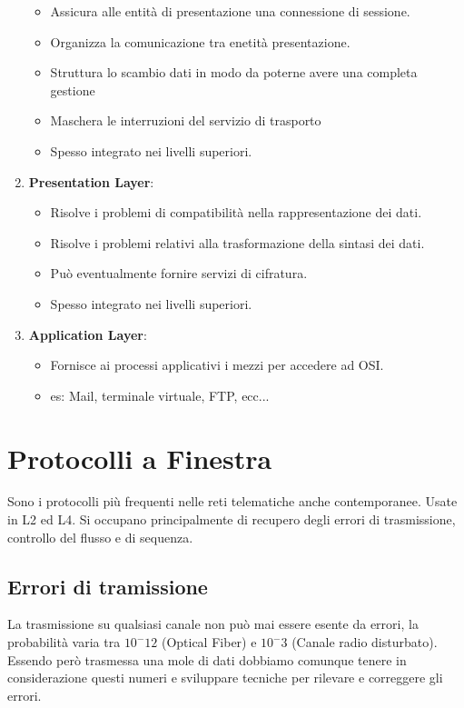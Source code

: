 \documentclass[12pt]{article}
\begin{document}
\begin{enumerate}
    \begin{itemize}
      \item Assicura alle entità di presentazione una connessione di sessione.
      \item Organizza la comunicazione tra enetità presentazione.
      \item Struttura lo scambio dati in modo da poterne avere una completa gestione
      \item Maschera le interruzioni del servizio di trasporto
      \item Spesso integrato nei livelli superiori.
    \end{itemize}
  \item \textbf{Presentation Layer}:
    \begin{itemize}
      \item Risolve i problemi di compatibilità nella rappresentazione dei dati.
      \item Risolve i problemi relativi alla trasformazione della sintasi dei dati.
      \item Può eventualmente fornire servizi di cifratura.
      \item Spesso integrato nei livelli superiori.
    \end{itemize}
    \item \textbf{Application Layer}:
      \begin{itemize}
        \item Fornisce ai processi applicativi i mezzi per accedere ad OSI.
        \item es: Mail, terminale virtuale, FTP, ecc...
      \end{itemize}
\end{enumerate} %

\section{Protocolli a Finestra}
Sono i protocolli più frequenti nelle reti telematiche anche contemporanee. Usate in L2 ed L4. Si occupano principalmente di recupero degli errori di trasmissione, controllo del flusso e di sequenza.
\subsection{Errori di tramissione}
La trasmissione su qualsiasi canale non può mai essere esente da errori, la probabilità varia tra $10^-12$ (Optical Fiber) e $10^-3$ (Canale radio disturbato). Essendo però trasmessa una mole di dati dobbiamo comunque tenere in considerazione questi numeri e sviluppare tecniche per rilevare e correggere gli errori.
\end{document}
